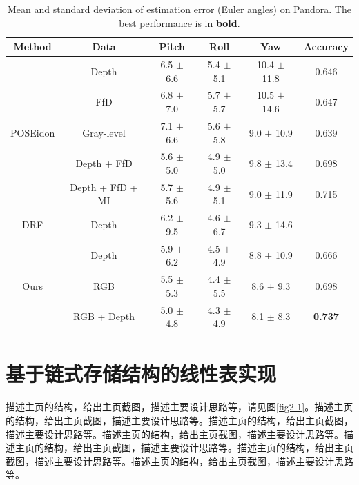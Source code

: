 \documentclass[supercite]{Experimental_Report}
\theoremstyle{definition}
\begin{document}
\begin{table}
	\begin{center}
		\setlength{\tabcolsep}{2.0mm}
		\caption{Mean and standard deviation of estimation error (Euler angles) on Pandora. The best performance is in \textbf{bold}.}
		\label{table2}
		\begin{tabular}{c|ccccc}
			\hline
			Method    			        & Data               & Pitch         & Roll           & Yaw              & Accuracy\\
			\hline
			\hline			
			\multirow{5}{*}{POSEidon}   & Depth              & 6.5 $\pm$ 6.6  & 5.4 $\pm$ 5.1  & 10.4 $\pm$ 11.8  & 0.646\\
			& FfD              	 & 6.8 $\pm$ 7.0  & 5.7 $\pm$ 5.7  & 10.5 $\pm$ 14.6  & 0.647\\
			& Gray-level         & 7.1 $\pm$ 6.6  & 5.6 $\pm$ 5.8  & 9.0  $\pm$ 10.9  & 0.639\\
			& Depth + FfD	     & 5.6 $\pm$ 5.0  & 4.9 $\pm$ 5.0  & 9.8  $\pm$ 13.4  & 0.698\\
			& Depth + FfD + MI   & 5.7 $\pm$ 5.6  & 4.9 $\pm$ 5.1  & 9.0  $\pm$ 11.9  & 0.715\\
			\hline
			DRF                         & Depth              & 6.2 $\pm$ 9.5  & 4.6 $\pm$ 6.7  & 9.3  $\pm$ 14.6  & --\\
			\hline
			\multirow{3}{*}{Ours}   	& Depth              & 5.9 $\pm$ 6.2  & 4.5 $\pm$ 4.9  & 8.8  $\pm$ 10.9  & 0.666\\
			& RGB                & 5.5 $\pm$ 5.3  & 4.4 $\pm$ 5.5  & 8.6  $\pm$ 9.3   & 0.698\\
			& RGB + Depth        & 5.0 $\pm$ 4.8  & 4.3 $\pm$ 4.9  & 8.1  $\pm$ 8.3   & \textbf{0.737}\\
			\hline
		\end{tabular}
	\end{center}
\end{table}

\newpage

\section{基于链式存储结构的线性表实现}

描述主页的结构，给出主页截图，描述主要设计思路等，请见图\ref{fig2-1}。描述主页的结构，给出主页截图，描述主要设计思路等。描述主页的结构，给出主页截图，描述主要设计思路等。描述主页的结构，给出主页截图，描述主要设计思路等。描述主页的结构，给出主页截图，描述主要设计思路等。描述主页的结构，给出主页截图，描述主要设计思路等。描述主页的结构，给出主页截图，描述主要设计思路等。
\end{document}
